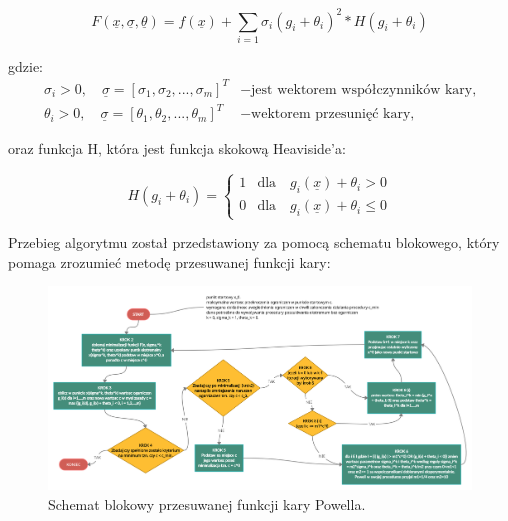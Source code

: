 \documentclass[a4paper,12pt]{article}
\begin{document}
\begin{equation} \label{eq:2}
    F(\underline{x}, \underline{\sigma}, \underline{\theta}) = f(\underline{x}) + \sum_{i=1} \sigma_{i}(g_{i} + \theta_{i})^{2} * H(g_{i} + \theta_{i})
\end{equation}

gdzie:
\begin{equation} \label{eq:3}
    \begin{split}
        \sigma_{i} > 0, \quad \underline{\sigma} = [\sigma_{1}, \sigma_{2}, ..., \sigma_{m}]^{T} &- \mbox{jest wektorem współczynników kary,} \\
        \theta_{i} > 0, \quad \underline{\sigma} = [\theta_{1}, \theta_{2}, ..., \theta_{m}]^{T} &- \mbox{wektorem przesunięć kary,}
    \end{split}
\end{equation}

oraz funkcja H, która jest funkcja skokową Heaviside’a:

\begin{equation} \label{eq:4}
    H(g_{i} + \theta_{i}) =
    \begin{cases}
        1 & \text{dla} \quad g_{i}(\underline{x}) + \theta_{i} > 0 \\
        0 & \text{dla} \quad g_{i}(\underline{x}) + \theta_{i} \leq 0
    \end{cases}
\end{equation}

\newpage
Przebieg algorytmu został przedstawiony za pomocą schematu blokowego, który pomaga zrozumieć metodę przesuwanej funkcji kary:

\begin{figure}[H]
    \centering
    \includegraphics[width=\textwidth]{images/uml_powell.png}
    \caption{Schemat blokowy przesuwanej funkcji kary Powella.}
    \label{uml_powell}
\end{figure}
\end{document}
